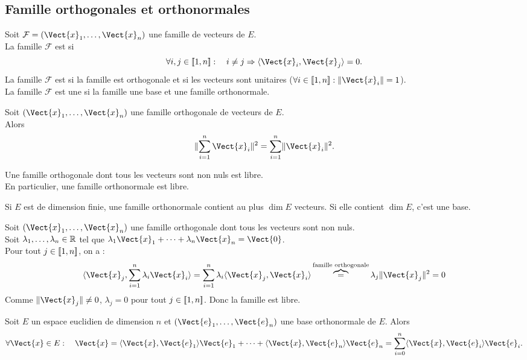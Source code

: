 \documentclass{book}
\begin{document}
\subsection{Famille orthogonales et orthonormales}   
\begin{Definition}
Soit $\mathcal{F} = (\Vect{x}_1,\dots,\Vect{x}_n)$ une famille de vecteurs de $E$.\\
La famille $\mathcal{F}$ est  si 
$$\forall i,j\in \Intf{1}{n}:\quad i\neq j \Rightarrow \PS{\Vect{x}_i}{\Vect{x}_j}=0.$$
La famille $\mathcal{F}$ est   si la famille est orthogonale et si les vecteurs sont unitaires ($\forall i\in \Intf{1}{n}:\norme{\Vect{x}_i}=1$).\\
La famille $\mathcal{F}$ est une  si la famille une base et une famille orthonormale.
\end{Definition}
\begin{Theoreme}
Soit $(\Vect{x}_1,\dots,\Vect{x}_n)$ une famille orthogonale de vecteurs de $E$.\\
Alors \[ \norme{\sum_{i=1}^n \Vect{x}_i }^2 = \sum_{i=1}^n \norme{\Vect{x}_i}^2. \]
\end{Theoreme}
\begin{Proposition}[libre]
Une famille orthogonale dont tous les vecteurs sont non nuls est libre.\\
En particulier, une famille orthonormale est libre.
\end{Proposition}
Si $E$ est de dimension finie, une famille orthonormale contient au plus $\dim E$ vecteurs. Si elle contient $\dim E$, c'est une base. 
\begin{Demonstration}
Soit $(\Vect{x}_1,\dots,\Vect{x}_n)$ une famille orthogonale dont tous les vecteurs sont non nuls.\\
Soit $\lambda_1,\dots,\lambda_n\in\mathbb{R} $ tel que $\lambda_1\Vect{x}_1+\dots+\lambda_n\Vect{x}_n=\Vect{0}$.\\
Pour tout $j\in \mathopen\lbrack\!\lbrack1,n \mathclose\rbrack\!\rbrack$, on a :
$$\PS{\Vect{x}_j}{\sum_{i=1}^n\lambda_i\Vect{x}_i}=\sum_{i=1}^n\lambda_i\PS{\Vect{x}_j}{\Vect{x}_i}\overbrace{=}^{\text{famille orthogonale}}\lambda_j \norme{\Vect{x}_j}^2=0 $$ 
Comme $\norme{\Vect{x}_j}\neq 0$, $\lambda_j=0$ pour tout $j\in \mathopen\lbrack\!\lbrack1,n \mathclose\rbrack\!\rbrack$. Donc la famille est libre.
\end{Demonstration}
\begin{Proposition}
Soit $E$ un espace euclidien de dimension $n$ et $(\Vect{e}_1,\dots,\Vect{e}_n)$ une base orthonormale de $E$.
Alors
$$\forall \Vect{x}\in E :  \quad  \Vect{x}=\PS{\Vect{x}}{\Vect{e}_1} \Vect{e}_1+\dots+\PS{\Vect{x}}{\Vect{e}_n}\Vect{e}_n=\sum_{i=0}^n\PS{\Vect{x}}{\Vect{e}_i}\Vect{e}_i.$$ 
\end{Proposition}
\end{document}
